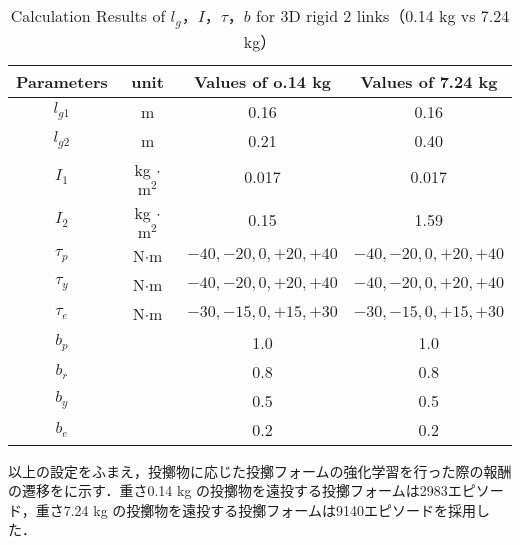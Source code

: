 \begin{table}[tb]
  \begin{center}
    \caption{Calculation Results of $l_{g}$，$I$，$\tau$，$b$ for 3D rigid 2 links（0.14 kg vs 7.24 kg）}
    \begin{tabular}{c|c|c|c}
      \hline
      Parameters & unit & Values of o.14 kg & Values of 7.24 kg \\
      \hline
      $l_{g1}$ & m & 0.16 & 0.16 \\
      $l_{g2}$ & m & 0.21 & 0.40 \\
      $I_{1}$ & kg $\cdot$ $\mathrm{m}^2$ & 0.017 & 0.017 \\
      $I_{2}$ & kg $\cdot$ $\mathrm{m}^2$ & 0.15 & 1.59 \\
      $\tau_{p}$ & N$\cdot$m & $-40, -20, 0, +20, +40$ & $-40, -20, 0, +20, +40$ \\
      $\tau_{y}$ & N$\cdot$m & $-40, -20, 0, +20, +40$ & $-40, -20, 0, +20, +40$ \\
      $\tau_{e}$ & N$\cdot$m & $-30, -15, 0, +15, +30$ & $-30, -15, 0, +15, +30$ \\
      $b_{p}$ &  & 1.0 & 1.0\\
      $b_{r}$ &  & 0.8 & 0.8\\
      $b_{y}$ &  & 0.5 & 0.5\\
      $b_{e}$ &  & 0.2 & 0.2\\
      \hline
    \end{tabular}
  \end{center}
\end{table}

以上の設定をふまえ，投擲物に応じた投擲フォームの強化学習を行った際の報酬の遷移をに示す．重さ0.14 kg の投擲物を遠投する投擲フォームは2983エピソード，重さ7.24 kg の投擲物を遠投する投擲フォームは9140エピソードを採用した．


